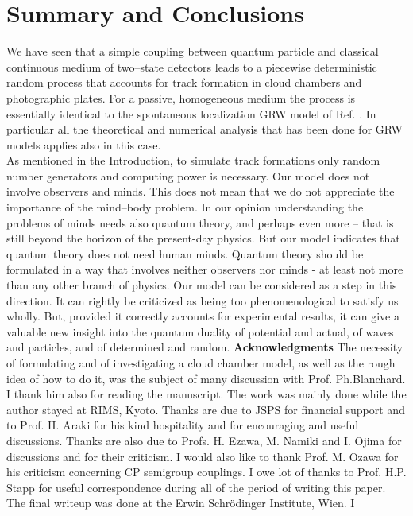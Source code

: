 \documentclass[12pt]{article}
\begin{document}
\section{Summary and Conclusions}
We have seen that a simple coupling between quantum particle and classical
continuous medium of two--state detectors leads to a piecewise
deterministic random process that accounts for track formation in cloud
chambers and photographic plates. For a passive, homogeneous medium the
process is essentially identical to the spontaneous localization GRW model
of Ref. \cite{ghi1}. In particular all the theoretical and numerical
analysis that has been done for GRW models applies also in this case.\\ As
mentioned in the Introduction, to simulate track formations only random
number generators and computing power is necessary. Our model does not
involve observers and minds. This does not mean that we do not appreciate
the importance of the mind--body problem. In our opinion understanding the
problems of minds needs also quantum theory, and perhaps even more -- that
is still beyond the horizon of the present-day physics. But our model
indicates that quantum theory does not need human minds. Quantum theory
should be formulated in a way that involves neither observers nor minds -
at least not more than any other branch of physics. Our model can be
considered as a step in this direction. It can rightly be criticized as
being too phenomenological to satisfy us wholly. But, provided it correctly
accounts for experimental results, it can give a valuable new insight into
the quantum duality of potential and actual, of waves and particles, and of
determined and random.
\newpage
\noindent
{\bf Acknowledgments}
The necessity of formulating and of investigating a cloud chamber model, as
well as the rough idea of how to do it, was the subject of many discussion
with Prof. Ph.Blanchard. I thank him also for reading the manuscript. The
work was mainly done while the author stayed at RIMS, Kyoto. Thanks are due
to JSPS for financial support and to Prof. H. Araki for his kind
hospitality and for encouraging and useful discussions. Thanks are also due
to Profs. H. Ezawa, M. Namiki and I. Ojima for discussions and for their
criticism. I would also like to thank Prof. M. Ozawa for his criticism
concerning CP semigroup couplings. I owe lot of thanks to Prof. H.P. Stapp
for useful correspondence during all of the period of writing this
paper.\\
The final writeup was done at the Erwin Schr\"odinger Institute, Wien. I
\end{document}
